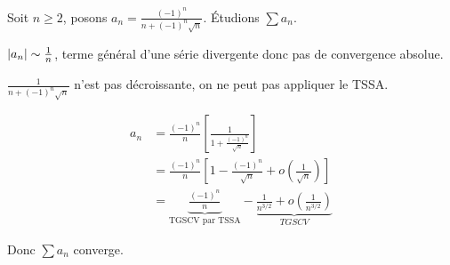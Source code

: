 \begin{exemple}
    Soit $n \geqslant 2$, posons $\displaystyle a_n = \frac{(-1)^n}{n + (-1)^n\sqrt{n}}$.
    Étudions $\sum a_n$.

    $\left|a_n\right| \sim \frac 1 n$, terme général d'une série divergente donc pas de convergence absolue. 

    $\displaystyle \frac 1 {n + (-1)^n \sqrt n}$ n'est pas décroissante, on ne peut pas appliquer le TSSA. 

    \begin{align*}
        a_n & = \frac{(-1)^n} n \left[ \frac 1 {1 + \frac{(-1)^n} {\sqrt n}} \right] \\
            & = \frac{(-1)^n} n \left[ 1 - \frac{(-1)^n}{\sqrt n} + o\left( \frac 1 {\sqrt n} \right) \right] \\
            & = \underbrace{\frac{(-1)^n} n}_{\text{TGSCV par TSSA}} - \underbrace{\frac 1 {n^{3/2}} + o\left( \frac 1 {n^{3/2}} \right)}_{TGSCV}
    \end{align*}
    
    Donc $\sum a_n$ converge.
\end{exemple}

